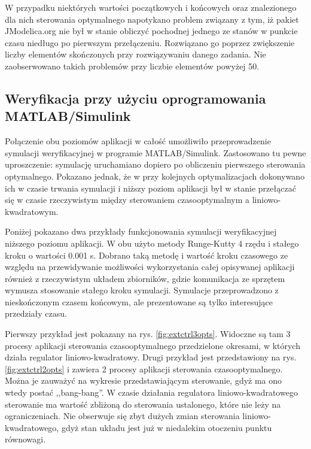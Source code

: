 W przypadku niektórych wartości początkowych i końcowych oraz znalezionego dla nich sterowania optymalnego napotykano problem związany z tym, iż pakiet JModelica.org nie był w stanie obliczyć pochodnej jednego ze stanów w punkcie czasu niedługo po pierwszym przełączeniu. Rozwiązano go poprzez zwiększenie liczby elementów skończonych przy rozwiązywaniu danego zadania. Nie zaobserwowano takich problemów przy liczbie elementów powyżej 50.

\subsection{Weryfikacja przy użyciu oprogramowania MATLAB/Simulink}
\label{sub:sym-wer-matlab}


Połączenie obu poziomów aplikacji w całość umożliwiło przeprowadzenie symulacji weryfikacyjnej w programie MATLAB/Simulink.
Zastosowano tu pewne uproszczenie: symulację uruchamiano dopiero po obliczeniu pierwszego sterowania optymalnego. Pokazano jednak, że w przy kolejnych optymalizacjach dokonywano ich w czasie trwania symulacji i niższy poziom aplikacji był w stanie przełączać się w czasie rzeczywistym między sterowaniem czasooptymalnym a liniowo-kwadratowym.

Poniżej pokazano dwa przykłady funkcjonowania symulacji weryfikacyjnej niższego poziomu aplikacji.
W obu użyto metody Runge-Kutty 4 rzędu i stałego kroku o wartości 0.001 s. Dobrano taką metodę i wartość kroku czasowego ze względu na przewidywanie możliwości wykorzystania całej opisywanej aplikacji również z rzeczywistym układem zbiorników, gdzie komunikacja ze sprzętem wymusza stosowanie stałego kroku symulacji.
Symulacje przeprowadzono z nieskończonym czasem końcowym, ale prezentowane są tylko interesujące przedziały czasu.

Pierwszy przykład jest pokazany na rys. \ref{fig:extctrl3opts}. Widoczne są tam 3 procesy aplikacji sterowania czasooptymalnego przedzielone okresami, w których działa regulator liniowo-kwadratowy.
Drugi przykład jest przedstawiony na rys. \ref{fig:extctrl2opts} i zawiera 2 procesy aplikacji sterowania czasooptymalnego.
Można je zauważyć na wykresie przedstawiającym sterowanie, gdyż ma ono wtedy postać ,,bang-bang''. W czasie działania regulatora liniowo-kwadratowego sterowanie ma wartość zbliżoną do sterowania ustalonego, które nie leży na ograniczeniach. Nie obserwuje się zbyt dużych zmian sterowania liniowo-kwadratowego, gdyż stan układu jest już w niedalekim otoczeniu punktu równowagi.

